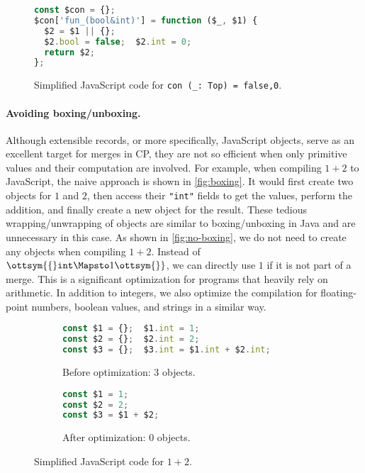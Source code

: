 \begin{figure}
\begin{lstlisting}[language=TypeScript]
const $con = {};
$con['fun_(bool&int)'] = function ($_, $1) {
  $2 = $1 || {};
  $2.bool = false;  $2.int = 0;
  return $2;
};
\end{lstlisting}
\caption{Simplified JavaScript code for \lstinline{con (_: Top) = false,0}.}
\label{fig:con}
\end{figure}

\paragraph{Avoiding boxing/unboxing.} \label{sec:boxing}
Although extensible records, or more specifically, JavaScript objects, serve as
an excellent target for merges in CP, they are not so efficient when only
primitive values and their computation are involved. For example, when compiling
$1 + 2$ to JavaScript, the naive approach is shown in \autoref{fig:boxing}. It
would first create two objects for $1$ and $2$, then access their
\lstinline{"int"} fields to get the values, perform the addition, and finally
create a new object for the result. These tedious wrapping/unwrapping of objects
are similar to boxing/unboxing in Java and are unnecessary in this case. As
shown in \autoref{fig:no-boxing}, we do not need to create any objects when
compiling $1 + 2$. Instead of $\ottsym{\{}   \mathtt{int}   \Mapsto  1  \ottsym{\}}$, we can directly use $1$ if it is
not part of a merge. This is a significant optimization for programs that
heavily rely on arithmetic. In addition to integers, we also optimize the
compilation for floating-point numbers, boolean values, and strings in a similar
way.

\begin{figure}
\begin{subfigure}{.47\textwidth}
\begin{lstlisting}[language=TypeScript]
const $1 = {};  $1.int = 1;
const $2 = {};  $2.int = 2;
const $3 = {};  $3.int = $1.int + $2.int;
\end{lstlisting}
\caption{Before optimization: 3 objects.} \label{fig:boxing}
\end{subfigure}\hspace{0.1\textwidth}%
\begin{subfigure}{.3\textwidth}
\begin{lstlisting}[language=TypeScript]
const $1 = 1;
const $2 = 2;
const $3 = $1 + $2;
\end{lstlisting}
\caption{After optimization: 0 objects.} \label{fig:no-boxing}
\end{subfigure}
\caption{Simplified JavaScript code for $1 + 2$.}
\end{figure}

